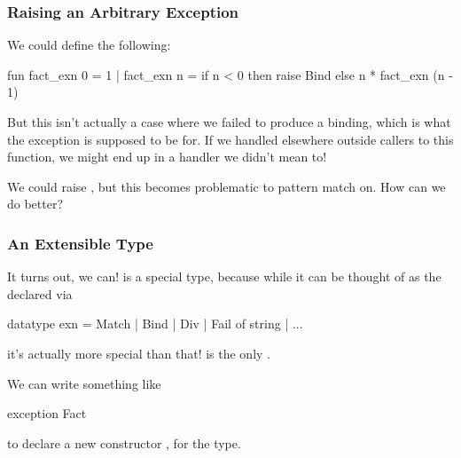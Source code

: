 \documentclass[aspectratio=169]{beamer}
\begin{document}
\begin{frame}[fragile]
  \frametitle{Raising an Arbitrary Exception}

  We could define the following: 
  \begin{codeblock}
    fun fact_exn 0 = 1
      | fact_exn n = 
          if n < 0 then 
            raise Bind
          else
            n * fact_exn (n - 1)
  \end{codeblock}
  
  \vspace{\fill}

  But this isn't actually a case where we failed to produce a binding, which
  is what the  exception is supposed to be for. If we handled
   elsewhere outside callers to this function, we might end up
  in a handler we didn't mean to! 

  \vspace{\fill}

  We could raise , but this becomes problematic
  to pattern match on. How can we do better?
\end{frame}

\begin{frame}[fragile]
  \frametitle{An Extensible Type}

  It turns out, we can!  is a special type, because while it can be
  thought of as the  declared via
  \begin{codeblock}
    datatype exn = Match | Bind | Div | Fail of string | ...
  \end{codeblock}
  it's actually more special than that!  is the only 
  .

  \vspace{\fill}


  \vspace{\fill}

  We can write something like
  \begin{codeblock}
    exception Fact
  \end{codeblock}
  to declare a new constructor , for the  type.
\end{frame}
\end{document}
